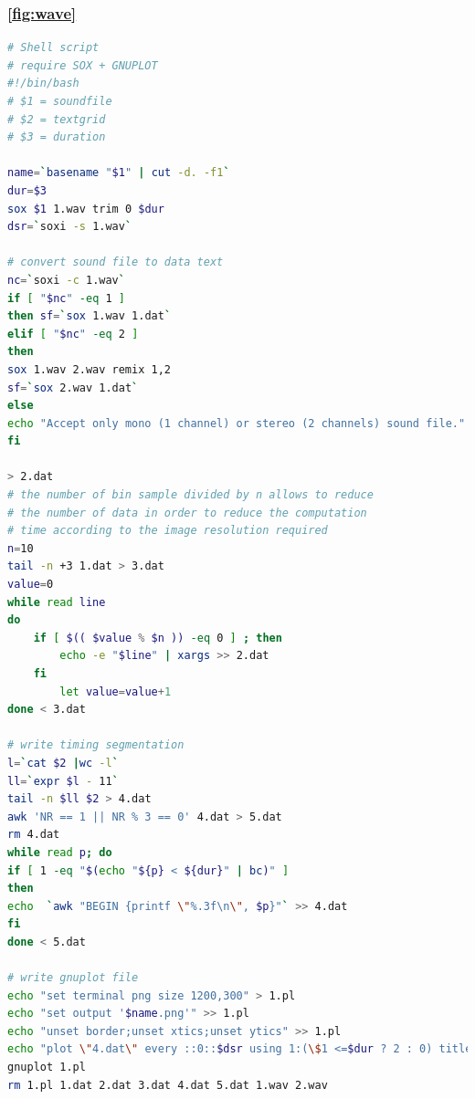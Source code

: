 \documentclass{book}
\begin{document}
\subsubsection{\ref{fig:wave}}
\label{an:wav}
\begin{lstlisting}[language=bash]
# Shell script
# require SOX + GNUPLOT
#!/bin/bash
# $1 = soundfile
# $2 = textgrid
# $3 = duration

name=`basename "$1" | cut -d. -f1`
dur=$3
sox $1 1.wav trim 0 $dur
dsr=`soxi -s 1.wav`

# convert sound file to data text
nc=`soxi -c 1.wav`
if [ "$nc" -eq 1 ]
then sf=`sox 1.wav 1.dat`
elif [ "$nc" -eq 2 ]
then 
sox 1.wav 2.wav remix 1,2
sf=`sox 2.wav 1.dat`
else
echo "Accept only mono (1 channel) or stereo (2 channels) sound file."
fi

> 2.dat
# the number of bin sample divided by n allows to reduce 
# the number of data in order to reduce the computation 
# time according to the image resolution required
n=10 
tail -n +3 1.dat > 3.dat
value=0
while read line
do
    if [ $(( $value % $n )) -eq 0 ] ; then
        echo -e "$line" | xargs >> 2.dat
    fi
        let value=value+1 
done < 3.dat

# write timing segmentation 
l=`cat $2 |wc -l`
ll=`expr $l - 11`
tail -n $ll $2 > 4.dat
awk 'NR == 1 || NR % 3 == 0' 4.dat > 5.dat
rm 4.dat
while read p; do
if [ 1 -eq "$(echo "${p} < ${dur}" | bc)" ]
then
echo  `awk "BEGIN {printf \"%.3f\n\", $p}"` >> 4.dat
fi
done < 5.dat	

# write gnuplot file
echo "set terminal png size 1200,300" > 1.pl
echo "set output '$name.png'" >> 1.pl
echo "unset border;unset xtics;unset ytics" >> 1.pl
echo "plot \"4.dat\" every ::0::$dsr using 1:(\$1 <=$dur ? 2 : 0) title '' with impulses lc rgb '#A9A9A9', \"2.dat\" every ::0::$dsr using 1:(\$2+1) with lines lc rgb '#696969' title \"\"" >> 1.pl
gnuplot 1.pl
rm 1.pl 1.dat 2.dat 3.dat 4.dat 5.dat 1.wav 2.wav	
\end{lstlisting}


%
%
%
%
%
%
%
\end{document}
